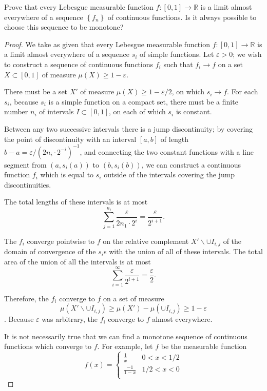 \documentclass[12pt]{article}
\newcommand{\R}{\mathbb{R}}
\newcommand{\bs}{\backslash}
\theoremstyle{definition}
\newenvironment{problem}[2][Problem]{\begin{trivlist}
\item[\hskip \labelsep {\bfseries #1}\hskip \labelsep {\bfseries #2.}]}{\end{trivlist}}
\begin{document}
\begin{problem}{2}
	Prove that every Lebesgue measurable function $f: [0,1] \to \R$ is a limit almost everywhere of a sequence $\left\{ f_n \right\}$ of continuous functions. Is it always possible to choose this sequence to be monotone?
	\begin{proof}
		We take as given that every Lebesgue measurable function $f: [0,1] \to \R$ is a limit almost everywhere of a sequence $s_i$ of simple functions. Let $\varepsilon > 0$; we wish to construct a sequence of continuous functions $f_i$ such that $f_i \to f$ on a set $X \subset [0,1]$ of measure $\mu(X)\geq 1-\varepsilon$.
		\par There must be a set $X'$ of measure $\mu(X) \geq 1 - \varepsilon/2$, on which $s_i \to f$. For each $s_i$, because $s_i$ is a simple function on a compact set, there must be a finite number $n_i$ of intervals $I \subset [0,1]$, on each of which $s_i$ is constant. 
		\par Between any two successive intervals there is a jump discontinuity; by covering the point of discontinuity with an interval $[a,b]$ of length $b-a = \varepsilon / (2n_i \cdot 2^{-i})^{-1}$, and connecting the two constant functions with a line segment from $(a, s_i(a))$ to $(b, s_i(b))$, we can construct a continuous function $f_i$ which is equal to $s_i$ outside of the intervals covering the jump discontinuities. 
	\par The total lengths of these intervals is at most
	\[\sum_{j=1}^{n_i}\frac{\varepsilon}{2n_1\cdot 2^{i}} = \frac{\varepsilon}{2^{i + 1}}.\]
	\par The $f_i$ converge pointwise to $f$ on the relative complement $X' \bs \cup I_{i,j}$ of the domain of convergence of the $s_i$s with the union of all of these intervals. The total area of the union of all the intervals is at most
	\[\sum_{i = 1}^\infty \frac{\varepsilon}{2^{i+1}} = \frac{\varepsilon}{2}.\]
	\par Therefore, the $f_i$ converge to $f$ on a set of measure \[\mu(X' \bs \cup I_{i,j}) \geq \mu(X') - \mu(\cup I_{i,j}) \geq 1 - \varepsilon\]. Because $\varepsilon$ was arbitrary, the $f_i$ converge to $f$ almost everywhere.
	\par It is not necessarily true that we can find a monotone sequence of continuous functions which converge to $f$. For example, let $f$ be the measurable function
	\[f(x) = \begin{cases}
			\frac{1}{x}& 0 < x < 1/2\\
			\frac{-1}{1 - x} & 1/2 < x < 0\\

\end{cases}\]
\end{proof}
\end{problem}
\end{document}
